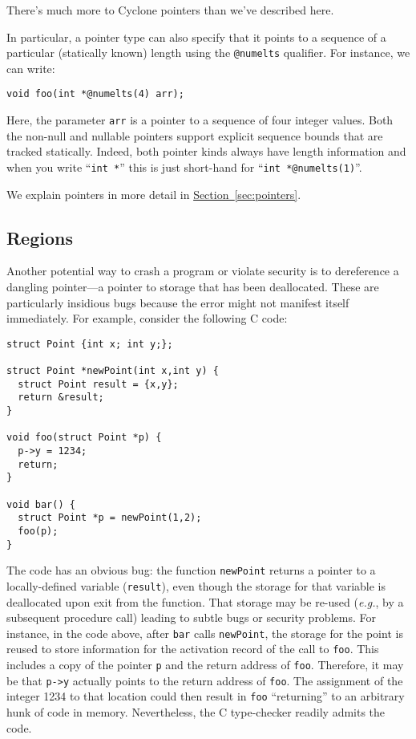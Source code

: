 There's much more to Cyclone pointers than we've described here.  

In particular, a pointer type can also specify that it points to a
sequence of a particular (statically known) length using the
\texttt{@numelts} qualifier.  For instance, we can write:
\begin{verbatim}
void foo(int *@numelts(4) arr);
\end{verbatim}
Here, the parameter \texttt{arr} is a pointer to a sequence of
four integer values.  Both the non-null and nullable pointers
support explicit sequence bounds that are tracked statically.
Indeed, both pointer kinds always have length information and
when you write ``\texttt{int *}'' this is just short-hand for
``\texttt{int *@numelts(1)}''.

We explain pointers in more detail in
\hyperref[{sec:pointers}]{Section~\ref{sec:pointers}}.

\subsection{Regions}

Another potential way to crash a program or violate security is
to dereference a dangling pointer---a pointer to storage that
has been deallocated.  These are particularly insidious bugs
because the error might not manifest itself immediately.  
For example, consider the following C code:
\begin{verbatim}
struct Point {int x; int y;};

struct Point *newPoint(int x,int y) {
  struct Point result = {x,y};
  return &result;
}

void foo(struct Point *p) {
  p->y = 1234;
  return;
}

void bar() {
  struct Point *p = newPoint(1,2);
  foo(p);
}
\end{verbatim}
The code has an obvious bug: the function \texttt{newPoint} returns a
pointer to a locally-defined variable (\texttt{result}), even though
the storage for that variable is deallocated upon exit from the
function.  That storage may be re-used (\emph{e.g.}, by a subsequent procedure
call) leading to subtle bugs or security problems.  For instance, in
the code above, after \texttt{bar} calls \texttt{newPoint}, the storage
for the point is reused to store information for the activation
record of the call to \texttt{foo}.  This includes a copy of the
pointer \texttt{p} and the return address of \texttt{foo}.  Therefore,
it may be that \texttt{p->y} actually points to the return address of
\texttt{foo}. The assignment of the integer 1234 to that location could
then result in \texttt{foo} ``returning'' to an arbitrary hunk of code
in memory.  Nevertheless, the C type-checker readily
admits the code.

